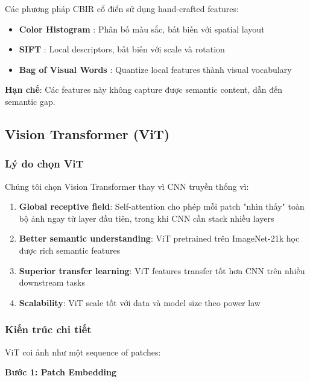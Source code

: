 \documentclass[12pt,a4paper]{article}
\begin{document}
Các phương pháp CBIR cổ điển sử dụng hand-crafted features:

\begin{itemize}
    \item \textbf{Color Histogram} \cite{swain1991color}: Phân bố màu sắc, bất biến với spatial layout
    \item \textbf{SIFT} \cite{lowe2004distinctive}: Local descriptors, bất biến với scale và rotation
    \item \textbf{Bag of Visual Words} \cite{sivic2003video}: Quantize local features thành visual vocabulary
\end{itemize}

\textbf{Hạn chế}: Các features này không capture được semantic content, dẫn đến semantic gap.

\subsection{Vision Transformer (ViT)}

\subsubsection{Lý do chọn ViT}

Chúng tôi chọn Vision Transformer thay vì CNN truyền thống vì:

\begin{enumerate}
    \item \textbf{Global receptive field}: Self-attention cho phép mỗi patch "nhìn thấy" toàn bộ ảnh ngay từ layer đầu tiên, trong khi CNN cần stack nhiều layers
    \item \textbf{Better semantic understanding}: ViT pretrained trên ImageNet-21k học được rich semantic features \cite{dosovitskiy2021vit}
    \item \textbf{Superior transfer learning}: ViT features transfer tốt hơn CNN trên nhiều downstream tasks \cite{he2022masked}
    \item \textbf{Scalability}: ViT scale tốt với data và model size theo power law
\end{enumerate}

\subsubsection{Kiến trúc chi tiết}

ViT \cite{dosovitskiy2021vit} coi ảnh như một sequence of patches:

\textbf{Bước 1: Patch Embedding}
\end{document}
